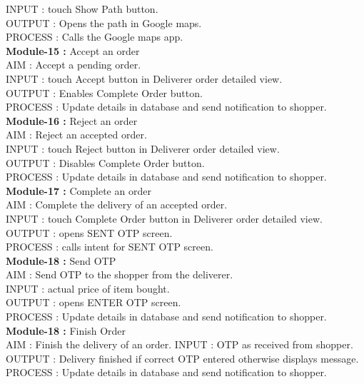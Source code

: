 \documentclass{report}
\begin{document}
					INPUT : touch Show Path button.\\
					OUTPUT : Opens the path in Google maps.\\
					PROCESS : Calls the Google maps app.\\
\newline
\textbf{Module-15 :} Accept an order\\
					AIM : Accept a pending order.\\
					INPUT : touch Accept button in Deliverer order detailed view.\\
					OUTPUT : Enables Complete Order button.\\
					PROCESS : Update details in database  and send notification to shopper.\\
\newline
\textbf{Module-16 :} Reject an order\\
					AIM : Reject an accepted order.\\
					INPUT : touch Reject button in Deliverer order detailed view.\\
                    OUTPUT : Disables Complete Order button.\\
                    PROCESS : Update details in database and send notification to shopper.\\
\newline
\textbf{Module-17 :} Complete an order\\
					AIM : Complete the delivery of an accepted order.\\
					INPUT : touch Complete Order button in Deliverer order detailed view.\\
					OUTPUT : opens SENT OTP screen.\\
					PROCESS : calls intent for SENT OTP screen.\\
\newline
\textbf{Module-18 :} Send OTP\\
					AIM : Send OTP to the shopper from the deliverer.\\
					INPUT : actual price of item bought.\\
					OUTPUT : opens ENTER OTP screen.\\
                    PROCESS : Update details in database and send notification to shopper.\\
\newline
\textbf{Module-18 :} Finish Order\\
                    AIM : Finish the delivery of an order.
INPUT : OTP as received from shopper.\\
                    OUTPUT : Delivery finished if correct OTP entered otherwise displays message.\\
                    PROCESS : Update details in database and send notification to shopper.\\
\end{document}
